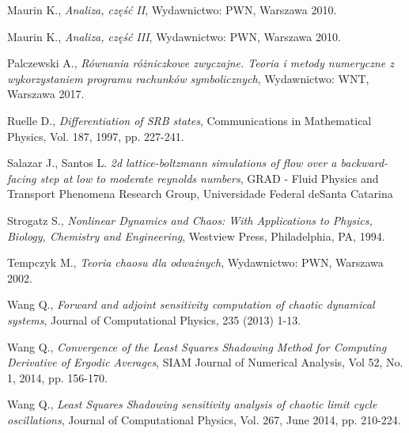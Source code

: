 \documentclass[12pt]{article}
\begin{document}
\begin{thebibliography}{99}
 Maurin K.,
\emph{Analiza, część II},
Wydawnictwo: PWN, Warszawa 2010.

 Maurin K.,
\emph{Analiza, część III},
Wydawnictwo: PWN, Warszawa 2010.

 Palczewski A.,
\emph{Równania różniczkowe zwyczajne. Teoria i metody numeryczne z wykorzystaniem programu rachunków symbolicznych},
Wydawnictwo: WNT, Warszawa 2017.

 Ruelle D.,
\emph{Differentiation of SRB states},
Communications in Mathematical Physics, Vol. 187, 1997, pp. 227-241.

 Salazar J., Santos L.
\emph{2d lattice-boltzmann simulations of flow over a backward-facing step at low to moderate reynolds numbers},
GRAD - Fluid Physics and Transport Phenomena Research Group, Universidade Federal deSanta Catarina
	
 Strogatz S., 
\emph{Nonlinear Dynamics and Chaos: With Applications to Physics, Biology, Chemistry and Engineering},
Westview Press, Philadelphia, PA, 1994.  

 Tempczyk M., 
\emph{Teoria chaosu dla odważnych},
Wydawnictwo: PWN, Warszawa 2002.
	
 Wang Q.,
\emph{Forward and adjoint sensitivity computation of chaotic dynamical systems},
Journal of Computational Physics, 235 (2013) 1-13.

 Wang Q.,
\emph{Convergence of the Least Squares Shadowing Method for Computing Derivative of Ergodic Averages},
SIAM Journal of Numerical Analysis, Vol 52, No. 1, 2014, pp. 156-170.  

 Wang Q., 
\emph{Least Squares Shadowing sensitivity analysis of chaotic limit cycle oscillations},
Journal of Computational Physics, Vol. 267, June 2014, pp. 210-224.  


\end{thebibliography} 
\end{document}
